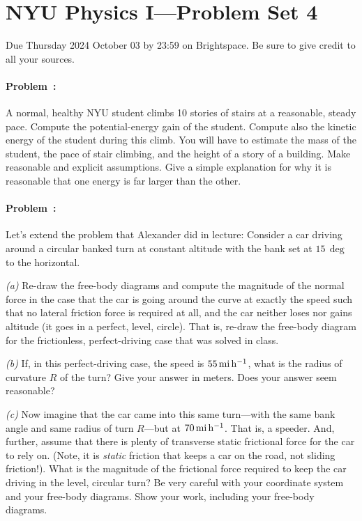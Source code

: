 \documentclass[12pt]{article}
\begin{document}
\section*{NYU Physics I---Problem Set 4}

Due Thursday 2024 October 03 by 23:59 on Brightspace.
Be sure to give credit to all your sources.

\paragraph{Problem~\theproblem:}%
A normal, healthy NYU student climbs 10 stories of stairs at a
reasonable, steady pace. Compute the potential-energy gain of the
student. Compute also the kinetic energy of the student during this
climb. You will have to estimate the mass of the student, the pace of
stair climbing, and the height of a story of a building. Make
reasonable and explicit assumptions. Give a simple explanation for why
it is reasonable that one energy is far larger than the other.

\paragraph{Problem~\theproblem:}%
Let's extend the problem that Alexander did in lecture:
Consider a car driving around a circular banked turn at
constant altitude with the bank set at $15\,\deg$ to the horizontal.

\textsl{(a)} Re-draw the free-body diagrams and compute the magnitude of
the normal force in the case that the car is going around the curve at
exactly the speed such that no lateral friction force is required at
all, and the car neither loses nor gains altitude (it goes in a
perfect, level, circle). That is, re-draw the free-body diagram for the
frictionless, perfect-driving case that was solved in class.

\textsl{(b)} If, in this perfect-driving case, the speed is $55\,\mathrm{mi}\,\mathrm{h}^{-1}$,
what is the radius of curvature $R$ of the turn? Give your answer in meters.
Does your answer seem reasonable?

\textsl{(c)} Now imagine that the car came into this same turn---with
the same bank angle and same radius of turn $R$---but at
$70\,\mathrm{mi}\,\mathrm{h}^{-1}$. That is, a speeder. And, further, assume that there is
plenty of transverse static frictional force for the car to rely on. (Note, it is
\emph{static} friction that keeps a car on the road, not sliding
friction!). What is the magnitude of the frictional force required to
keep the car driving in the level, circular turn? Be very careful with
your coordinate system and your free-body diagrams. Show your work, including your free-body diagrams.
\end{document}
